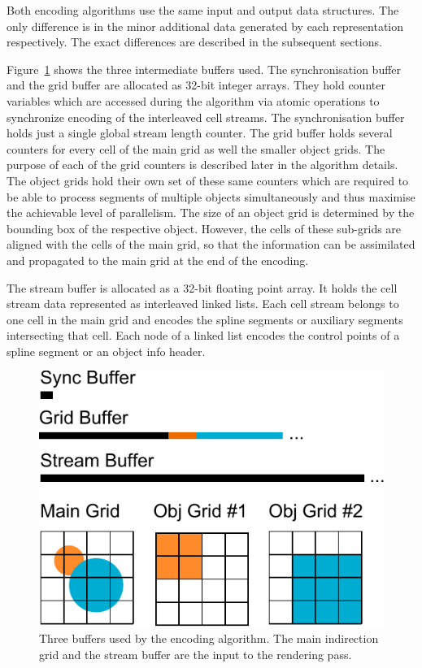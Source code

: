 \documentclass[11pt,a4paper,twoside]{article}
\begin{document}
Both encoding algorithms use the same input and output data structures. The only difference is in the minor additional data generated by each representation respectively. The exact differences are described in the subsequent sections.

Figure~\ref{fig:data_buffers} shows the three intermediate buffers used. The synchronisation buffer and the grid buffer are allocated as 32-bit integer arrays. They hold counter variables which are accessed during the algorithm via atomic operations to synchronize encoding of the interleaved cell streams. The synchronisation buffer holds just a single global stream length counter. The grid buffer holds several counters for every cell of the main grid as well the smaller object grids. The purpose of each of the grid counters is described later in the algorithm details. The object grids hold their own set of these same counters which are required to be able to process segments of multiple objects simultaneously and thus maximise the achievable level of parallelism. The size of an object grid is determined by the bounding box of the respective object. However, the cells of these sub-grids are aligned with the cells of the main grid, so that the information can be assimilated and propagated to the main grid at the end of the encoding.

The stream buffer is allocated as a 32-bit floating point array. It holds the cell stream data represented as interleaved linked lists. Each cell stream belongs to one cell in the main grid and encodes the spline segments or auxiliary segments intersecting that cell. Each node of a linked list encodes the control points of a spline segment or an object info header.

\begin {figure}
	\centering
	\includegraphics[width=0.5\columnwidth] {figures/data_buffers}
	\caption {Three buffers used by the encoding algorithm. The main indirection grid and the stream buffer are the input to the rendering pass.}
	\label {fig:data_buffers}
\end {figure}
\end{document}
